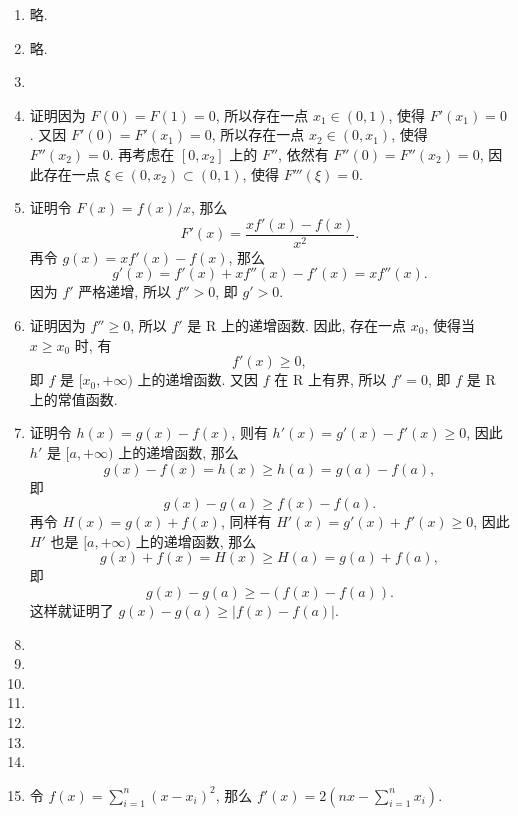 \documentclass[a4paper, 10pt]{ctexart}
\begin{document}
\pagestyle{empty}
\begin{enumerate}
    \item %
        略.
    \item %
        略.
    \item %
    \item %
        {\heiti 证明}\quad 因为 $F(0) = F(1) = 0$, 所以存在一点 $x_1 \in (0, 1)$, 使得 $F'(x_1) = 0$.
        又因 $F'(0) = F'(x_1) = 0$, 所以存在一点 $x_2 \in (0, x_1)$, 使得 $F''(x_2) = 0$. 再考虑在 $[0, x_2]$ 上的 $F''$,
        依然有 $F''(0) = F''(x_2) = 0$, 因此存在一点 $\xi \in (0, x_2) \subset (0, 1)$, 使得 $F'''(\xi) = 0$.
    \item %
        {\heiti 证明}\quad 令 $F(x) = f(x)/x$, 那么
        \[
            F'(x) = \frac{xf'(x) - f(x)}{x^2}.    
        \]
        再令 $g(x) = xf'(x) - f(x)$, 那么
        \[
            g'(x) = f'(x) + xf''(x) - f'(x) = xf''(x).    
        \]
        因为 $f'$ 严格递增, 所以 $f'' > 0$, 即 $g' > 0$.
    \item %
        {\heiti 证明}\quad 因为 $f'' \geqslant 0$, 所以 $f'$ 是 $\mathrm{R}$ 上的递增函数.
        因此, 存在一点 $x_0$, 使得当 $x \geqslant x_0$ 时, 有
        \[
            f'(x) \geqslant 0,
        \]
        即 $f$ 是 $[x_0, +\infty)$ 上的递增函数. 又因 $f$ 在 $\mathrm{R}$ 上有界, 所以 $f' = 0$, 即 $f$ 是 $\mathrm{R}$ 上的常值函数.
    \item %
        {\heiti 证明}\quad 令 $h(x) = g(x) - f(x)$, 则有 $h'(x) = g'(x) - f'(x) \geqslant 0$, 因此 $h'$ 是 $[a, +\infty)$ 上的递增函数, 那么
        \[
            g(x) - f(x) = h(x) \geqslant h(a) = g(a) - f(a),
        \]
        即
        \[
            g(x) - g(a) \geqslant f(x) - f(a).    
        \]
        再令 $H(x) = g(x) + f(x)$, 同样有 $H'(x) = g'(x) + f'(x) \geqslant 0$, 因此 $H'$ 也是 $[a, +\infty)$ 上的递增函数, 那么
        \[
            g(x) + f(x) = H(x) \geqslant H(a) = g(a) + f(a),    
        \]
        即
        \[
            g(x) - g(a) \geqslant -(f(x) - f(a)).     
        \]
        这样就证明了 $g(x) - g(a) \geqslant |f(x) - f(a)|$.
    \item %
    \item %
    \item %
    \item %
    \item %
    \item %
    \item %
    \item %
        令 $f(x) = \sum\limits_{i=1}^n(x-x_i)^2$, 那么 $f'(x) = 2\left(nx - \sum\limits_{i=1}^n x_i\right)$.

\end{enumerate}
\end{document}
